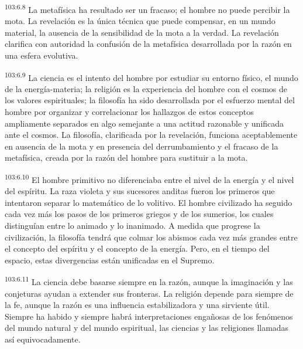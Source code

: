 \par
\textsuperscript{103:6.8} La metafísica ha resultado ser un fracaso; el hombre no puede percibir la mota. La revelación es la única técnica que puede compensar, en un mundo material, la ausencia de la sensibilidad de la mota a la verdad. La revelación clarifica con autoridad la confusión de la metafísica desarrollada por la razón en una esfera evolutiva.

\par
\textsuperscript{103:6.9} La ciencia es el intento del hombre por estudiar su entorno físico, el mundo de la energía-materia; la religión es la experiencia del hombre con el cosmos de los valores espirituales; la filosofía ha sido desarrollada por el esfuerzo mental del hombre por organizar y correlacionar los hallazgos de estos conceptos ampliamente separados en algo semejante a una actitud razonable y unificada ante el cosmos. La filosofía, clarificada por la revelación, funciona aceptablemente en ausencia de la mota y en presencia del derrumbamiento y el fracaso de la metafísica, creada por la razón del hombre para sustituir a la mota.

\par
\textsuperscript{103:6.10} El hombre primitivo no diferenciaba entre el nivel de la energía y el nivel del espíritu. La raza violeta y sus sucesores anditas fueron los primeros que intentaron separar lo matemático de lo volitivo. El hombre civilizado ha seguido cada vez más los pasos de los primeros griegos y de los sumerios, los cuales distinguían entre lo animado y lo inanimado. A medida que progrese la civilización, la filosofía tendrá que colmar los abismos cada vez más grandes entre el concepto del espíritu y el concepto de la energía. Pero, en el tiempo del espacio, estas divergencias están unificadas en el Supremo.

\par
\textsuperscript{103:6.11} La ciencia debe basarse siempre en la razón, aunque la imaginación y las conjeturas ayudan a extender sus fronteras. La religión depende para siempre de la fe, aunque la razón es una influencia estabilizadora y una sirviente útil. Siempre ha habido y siempre habrá interpretaciones engañosas de los fenómenos del mundo natural y del mundo espiritual, las ciencias y las religiones llamadas así equivocadamente.

